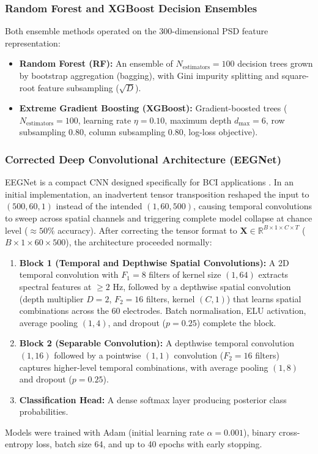 \documentclass[11pt,a4paper]{article}
\begin{document}
\subsubsection{Random Forest and XGBoost Decision Ensembles}
Both ensemble methods operated on the 300-dimensional PSD feature representation:
\begin{itemize}
    \item \textbf{Random Forest (RF):} An ensemble of $N_{\text{estimators}} = 100$ decision trees grown by bootstrap aggregation (bagging), with Gini impurity splitting and square-root feature subsampling ($\sqrt{D}$).
    \item \textbf{Extreme Gradient Boosting (XGBoost):} Gradient-boosted trees ($N_{\text{estimators}} = 100$, learning rate $\eta = 0.10$, maximum depth $d_{\text{max}} = 6$, row subsampling $0.80$, column subsampling $0.80$, log-loss objective).
\end{itemize}

\subsubsection{Corrected Deep Convolutional Architecture (EEGNet)}
EEGNet is a compact CNN designed specifically for BCI applications \cite{lawhern2018eegnet}. In an initial implementation, an inadvertent tensor transposition reshaped the input to $(500, 60, 1)$ instead of the intended $(1, 60, 500)$, causing temporal convolutions to sweep across spatial channels and triggering complete model collapse at chance level ($\approx50\%$ accuracy). After correcting the tensor format to $\mathbf{X} \in \mathbb{R}^{B \times 1 \times C \times T}$ ($B \times 1 \times 60 \times 500$), the architecture proceeded normally:
\begin{enumerate}
    \item \textbf{Block 1 (Temporal and Depthwise Spatial Convolutions):} A 2D temporal convolution with $F_1 = 8$ filters of kernel size $(1, 64)$ extracts spectral features at $\geq 2\text{ Hz}$, followed by a depthwise spatial convolution (depth multiplier $D = 2$, $F_2 = 16$ filters, kernel $(C, 1)$) that learns spatial combinations across the 60 electrodes. Batch normalisation, ELU activation, average pooling $(1, 4)$, and dropout ($p=0.25$) complete the block.
    \item \textbf{Block 2 (Separable Convolution):} A depthwise temporal convolution $(1, 16)$ followed by a pointwise $(1, 1)$ convolution ($F_2 = 16$ filters) captures higher-level temporal combinations, with average pooling $(1, 8)$ and dropout ($p=0.25$).
    \item \textbf{Classification Head:} A dense softmax layer producing posterior class probabilities.
\end{enumerate}
Models were trained with Adam (initial learning rate $\alpha = 0.001$), binary cross-entropy loss, batch size 64, and up to 40 epochs with early stopping.
\end{document}
